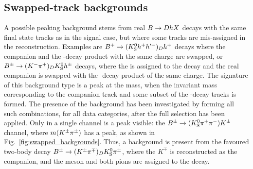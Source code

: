 
\subsection{Swapped-track backgrounds} %
\label{sub:swapped_track_backgrounds}

A possible peaking background stems from real ${B}\rightarrow{\ensuremath{D}} h X$ decays with the same final state tracks as in the signal case, but where some tracks are mis-assigned in the reconstruction. Examples are ${{{B}^+}}\rightarrow({{K}^0_{\mathrm{S}}} h^+h'^-)_Dh^+$ decays where the companion and the \D-decay product with the same charge are swapped, or ${{B}^\pm}\rightarrow(K^-{{\pi}^+})_D {{K}^0_{\mathrm{S}}} h^\pm$ decays, where the \KS is assigned to the \D decay and the real companion is swapped with the \D-decay product of the same charge. 
The signature of this background type is a peak at the \D mass, when the invariant mass corresponding to the companion track and some subset of the \D-decay tracks is formed. The presence of the background has been investigated by forming all such combinations, for all data categories, after the full selection has been applied. Only in a single channel is a peak visible: the ${{B}^\pm}\rightarrow({{K}^0_{\mathrm{S}}}{{\pi}^+}{{\pi}^-}){{K}^\pm}$ channel, where $m({{K}^\pm}{{\pi}^\pm})$ has a peak, as shown in Fig.~\ref{fig:swapped_backgrounds}. Thus, a background is present from the favoured two-body \D decay ${{B}^\pm}\rightarrow(K^\pm{\ensuremath{{\pi}^\mp}})_D {{K}^0_{\mathrm{S}}} {{\pi}^\pm}$, where the $K^\mp$ is reconstructed as the companion, and the \Ks meson and both pions are assigned to the \D decay. 

